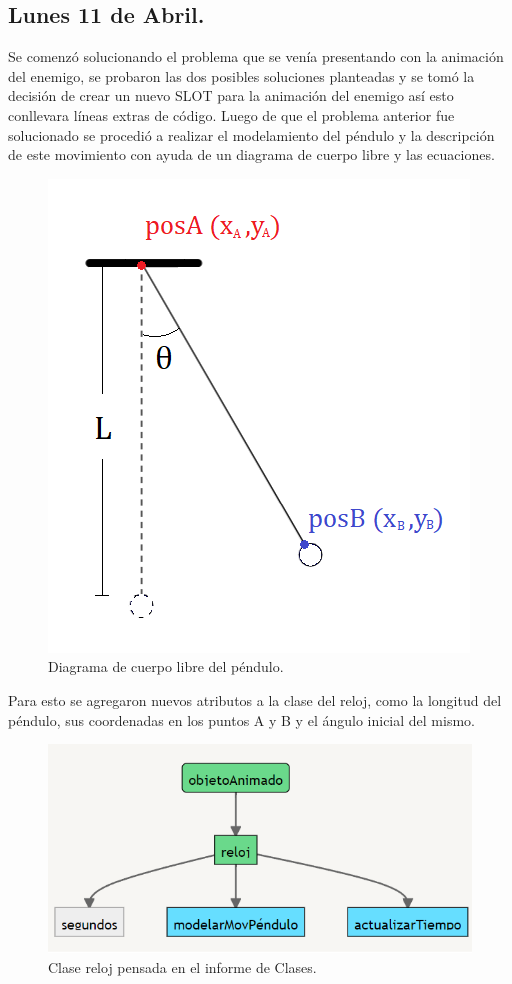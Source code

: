 \documentclass{article}
\begin{document}
\subsection{Lunes 11 de Abril.}
Se comenzó solucionando el problema que se venía presentando con la animación del enemigo, se probaron las dos posibles soluciones planteadas y se tomó la decisión de crear un nuevo SLOT para la animación del enemigo así esto conllevara líneas extras de código. Luego de que el problema anterior fue solucionado se procedió a realizar el modelamiento del péndulo y la descripción de este movimiento con ayuda de un diagrama de cuerpo libre y las ecuaciones. 

\begin{figure}[h]
\includegraphics[scale=0.6]{Images/diagramapendulo.png}
\centering
\caption{Diagrama de cuerpo libre del péndulo.}
\label{fig:diagrama}
\end{figure}

Para esto se agregaron nuevos atributos a la clase del reloj, como la longitud del péndulo, sus coordenadas en los puntos A y B y el ángulo inicial del mismo.

\begin{figure}[h]
\includegraphics[scale=0.5]{Images/reloj.png}
\centering
\caption{Clase reloj pensada en el informe de Clases.}
\label{fig:reloj}
\end{figure}
\end{document}

